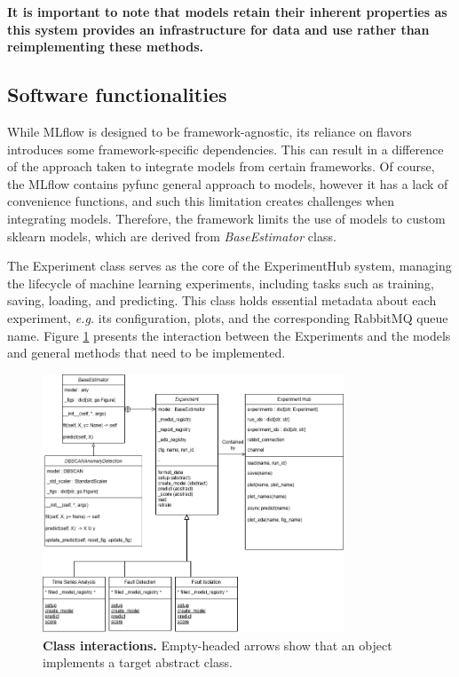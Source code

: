 \documentclass[preprint,12pt, a4paper]{elsarticle}
\begin{document}
\textbf{It is important to note that models retain their inherent properties as this system provides an infrastructure for data and use rather than reimplementing these methods.}


 \subsection{Software functionalities} \label{framework}
While MLflow is designed to be framework-agnostic, its reliance on flavors introduces some framework-specific dependencies. This can result in a difference of the approach taken to integrate models from certain frameworks. Of course, the MLflow contains pyfunc general approach to models, however it has a lack of convenience functions, and such this limitation creates challenges when integrating models. Therefore, the framework limits the use of models to custom sklearn models, which are derived from \textit{BaseEstimator} class.


The Experiment class serves as the core of the ExperimentHub system, managing the lifecycle of machine learning experiments, including tasks such as training, saving, loading, and predicting. This class holds essential metadata about each experiment, \textit{e.g.} its configuration, plots, and the corresponding RabbitMQ queue name. Figure \ref{fig2} presents the interaction between the Experiments and the models and general methods that need to be implemented.

\begin{figure}[!h]
\centering
\includegraphics[width=0.8\textwidth, clip, trim={0 0 0 0}]{figs/class_interactions.png}
\caption{\textbf{Class interactions.} Empty-headed arrows show that an object implements a target abstract class.}
\label{fig2}
\end{figure}
\end{document}
